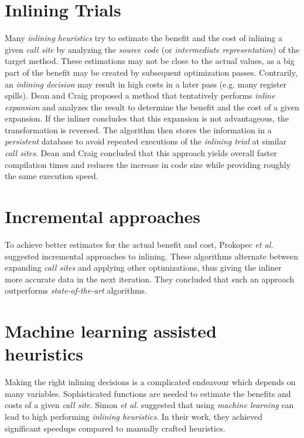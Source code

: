 \documentclass[draft, final]{vutinfth} %
\begin{document}
\section{Inlining Trials}

Many \emph{inlining heuristics} try to estimate the benefit and the cost of inlining a given \emph{call site} by analyzing the \emph{source code} (or \emph{intermediate representation}) of the target method. These estimations may not be close to the actual values, as a big part of the benefit may be created by subsequent optimization passes. Contrarily, an \emph{inlining decision} may result in high costs in a later pass (e.g. many register spills). Dean and Craig \cite{Dean94} proposed a method that tentatively performs \emph{inline expansion} and analyzes the result to determine the benefit and the cost of a given expansion. If the inliner concludes that this expansion is not advantageous, the transformation is reversed. The algorithm then stores the information in a \emph{persistent} database to avoid repeated executions of the \emph{inlining trial} at similar \emph{call sites}. Dean and Craig concluded that this approach yields overall faster compilation times and reduces the increase in code size while providing roughly the same execution speed.

\section{Incremental approaches}

To achieve better estimates for the actual benefit and cost, Prokopec \emph{et al.}\cite{Prokopec19} suggested incremental approaches to inlining. These algorithms alternate between expanding \emph{call sites} and applying other optimizations, thus giving the inliner more accurate data in the next iteration. They concluded that such an approach outperforms \emph{state-of-the-art} algorithms.

\section{Machine learning assisted heuristics}

Making the right inlining decisions is a complicated endeavour which depends on many variables. Sophisticated functions are needed to estimate the benefits and costs of a given \emph{call site}. Simon \emph{et al.} \cite{Simon13} suggested that using \emph{machine learning} can lead to high performing \emph{inlining heuristics}. In their work, they achieved significant speedups compared to manually crafted heuristics. 
\end{document}
